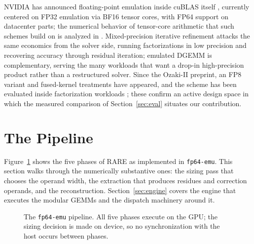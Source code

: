 \documentclass[11pt]{amsart}
\theoremstyle{plain}
\theoremstyle{definition}
\newcommand{\code}[1]{\texttt{#1}}
\newcommand{\fpemu}{\code{fp64-emu}}
\begin{document}
NVIDIA has announced floating-point emulation inside cuBLAS itself
\cite{nvidiablog}, currently centered on FP32 emulation via BF16 tensor
cores, with FP64 support on datacenter parts; the numerical behavior of
tensor-core arithmetic that such schemes build on is analyzed in
\cite{fasi2021,markidis2018}. Mixed-precision iterative refinement
\cite{haidar2018} attacks the same economics from the solver side,
running factorizations in low precision and recovering accuracy through
residual iteration; emulated DGEMM is complementary, serving the many
workloads that want a drop-in high-precision product rather than a
restructured solver. Since the Ozaki-II preprint, an FP8 variant
\cite{fp8ozaki} and fused-kernel treatments \cite{emugemm} have appeared,
and the scheme has been evaluated inside factorization workloads
\cite{factorizations}; these confirm an active design space in which the
measured comparison of Section~\ref{sec:eval} situates our contribution.

\section{The Pipeline}\label{sec:method}

Figure~\ref{fig:pipeline} shows the five phases of RARE as implemented in
\fpemu{}. This section
walks through the numerically substantive ones: the sizing pass that
chooses the operand width, the extraction that produces residues and
correction operands, and the reconstruction. Section~\ref{sec:engine}
covers the engine that executes the modular GEMMs and the dispatch
machinery around it.

\begin{figure}[t]
\centering
{}
\caption{The \fpemu{} pipeline. All five phases execute on the GPU; the
sizing decision is made on device, so no synchronization with the host
occurs between phases.}
\label{fig:pipeline}
\end{figure}
\end{document}

